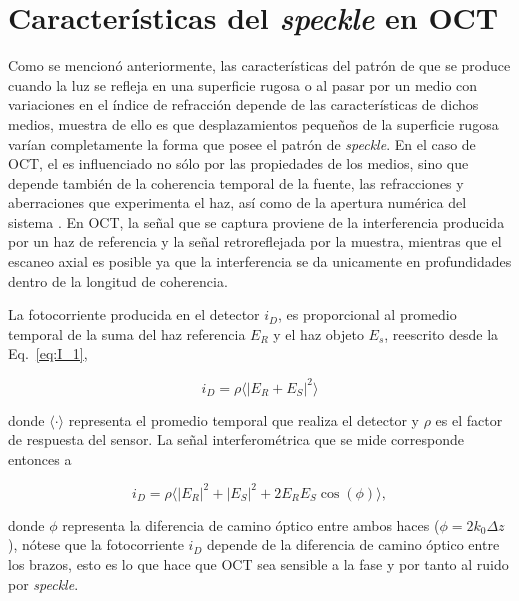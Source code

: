 
\section{Características del \textit{speckle} en OCT}
\label{sec:caracteristicas_speckle}

Como se mencionó anteriormente, las características del patrón de \speckle que se produce cuando la luz se refleja en una superficie rugosa o al pasar por un medio con variaciones en el índice de refracción depende de las características de dichos medios, muestra de ello es que desplazamientos pequeños de la superficie rugosa varían completamente la forma que posee el patrón de \textit{speckle}. En el caso de OCT, el \speckle es influenciado no sólo por las propiedades de los medios, sino que depende también de la coherencia temporal de la fuente, las refracciones y aberraciones que experimenta el haz, así como de la apertura numérica del sistema \cite{Schmitt1999}. En OCT, la señal que se captura proviene de la interferencia producida por un haz de referencia y la señal retroreflejada por la muestra, mientras que el escaneo axial es posible ya que la interferencia se da unicamente en profundidades dentro de la longitud de coherencia. 

La fotocorriente producida en el detector $i_D$, es proporcional al promedio temporal de la suma del haz referencia $E_R$ y el haz objeto $E_s$, reescrito desde la Eq.~\ref{eq:I_1},

\begin{equation}
i_D = \rho \langle\lvert E_R+E_S \rvert^2\rangle
\end{equation}

\noindent donde $\langle \cdot \rangle$ representa el promedio temporal que realiza el detector y $\rho$ es el factor de respuesta del sensor. La señal interferométrica que se mide corresponde entonces a

\begin{equation}
i_D = \rho \langle\lvert E_R\rvert^2 + \lvert E_S \rvert^2 + 2E_R E_S \cos(\phi)\rangle,
\end{equation}

\noindent donde $\phi$ representa la diferencia de camino óptico entre ambos haces ($\phi = 2 k_0 \Delta z$), nótese que la fotocorriente $i_D$ depende de la diferencia de camino óptico entre los brazos, esto es lo que hace que OCT sea sensible a la fase y por tanto al ruido por \textit{speckle}. 

